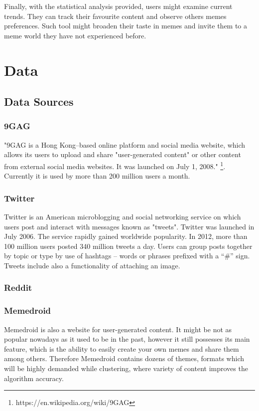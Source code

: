 \documentclass{article}
\begin{document}
Finally, with the statistical analysis provided, users might examine current trends. They can track their favourite content and observe others memes preferences. Such tool might broaden their taste in memes and invite them to a meme world they have not experienced before. 


\section{Data}
\subsection{Data Sources}
\subsubsection{9GAG}
"9GAG is a Hong Kong–based online platform and social media website, which allows its users to upload and share "user-generated content" or other content from external social media websites. It was launched on July 1, 2008." \footnote{https://en.wikipedia.org/wiki/9GAG}. Currently it is used by more than 200 million users a month.


\subsubsection{Twitter}
Twitter is an American microblogging and social networking service on which users post and interact with messages known as "tweets". Twitter was launched in July 2006. The service rapidly gained worldwide popularity. In 2012, more than 100 million users posted 340 million tweets a day. Users can group posts together by topic or type by use of hashtags – words or phrases prefixed with a “\#” sign. Tweets include also a functionality of attaching an image.

\subsubsection{Reddit}

\subsubsection{Memedroid}
Memedroid is also a website for user-generated content. It might be not as popular nowadays as it used to be in the past, however it still possesses its main feature, which is the ability to easily create your own memes and share them among others. Therefore Memedroid contains dozens of themes, formats which will be highly demanded while clustering, where variety of content improves the algorithm accuracy. 
\end{document}
